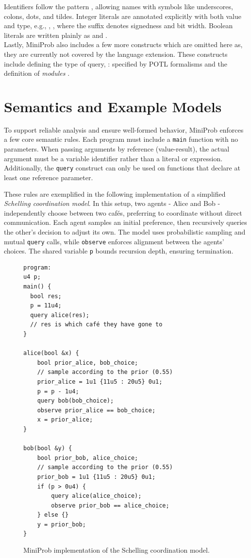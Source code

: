 Identifiers follow the pattern \code{[a-zA-Z\_][a-zA-Z0-9.\_\:$\sim$]*}, allowing names with symbols like underscores, colons, dots, and tildes.
Integer literals are annotated explicitly with both value and type, e.g., , , where the suffix denotes signedness and bit width.
Boolean literals are written plainly as  and .
\\

Lastly, MiniProb also includes a few more constructs which are omitted here as, they are currently not covered by the language extension.
These constructs include  defining the type of query, : specified by POTL formalisms and the definition of \emph{modules} \cite{guideMiniProb}.

\section{Semantics and Example Models}

To support reliable analysis and ensure well-formed behavior, MiniProb enforces a few core semantic rules. Each program must include a \texttt{main} function with no parameters. When passing arguments by reference (value-result), the actual argument must be a variable identifier rather than a literal or expression. Additionally, the \texttt{query} construct can only be used on functions that declare at least one reference parameter.

These rules are exemplified in the following implementation of a simplified \textit{Schelling coordination model}. In this setup, two agents - Alice and Bob - independently choose between two cafés, preferring to coordinate without direct communication. Each agent samples an initial preference, then recursively queries the other's decision to adjust its own. The model uses probabilistic sampling and mutual \texttt{query} calls, while \texttt{observe} enforces alignment between the agents’ choices. The shared variable \texttt{p} bounds recursion depth, ensuring termination.
\begin{figure}[ht]
  \centering
  \begin{minipage}{0.85\textwidth}
    \begin{verbatim}
program:
u4 p;
main() {
  bool res;
  p = 11u4;
  query alice(res);
  // res is which café they have gone to
}

alice(bool &x) {
    bool prior_alice, bob_choice;
    // sample according to the prior (0.55)
    prior_alice = 1u1 {11u5 : 20u5} 0u1;
    p = p - 1u4;
    query bob(bob_choice);
    observe prior_alice == bob_choice;
    x = prior_alice;
}

bob(bool &y) {
    bool prior_bob, alice_choice;
    // sample according to the prior (0.55)
    prior_bob = 1u1 {11u5 : 20u5} 0u1;
    if (p > 0u4) {
        query alice(alice_choice);
        observe prior_bob == alice_choice;
    } else {}
    y = prior_bob;
}
\end{verbatim}
  \end{minipage}
  \caption{MiniProb implementation of the Schelling coordination model.}
  \label{fig:schelling}
\end{figure}